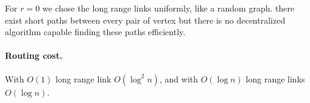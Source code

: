 For $r=0$ we chose the long range links uniformly, like a random graph. there exist short paths between every pair of vertex but there is no decentralized algorithm capable finding these paths efficiently.

\paragraph{Routing cost.} With $O(1)$ long range link $O(\log^2 n)$, and with $O(\log n)$ long range links $O(\log n)$.
